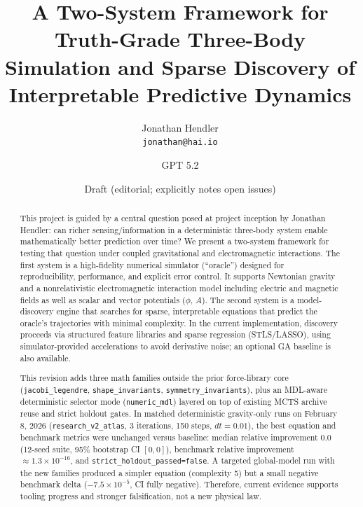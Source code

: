 \documentclass[11pt]{article}
\title{A Two-System Framework for Truth-Grade Three-Body Simulation and Sparse Discovery of Interpretable Predictive Dynamics}
\author{Jonathan Hendler\\\texttt{jonathan@hai.io} \and GPT 5.2}
\date{Draft (editorial; explicitly notes open issues)}
\begin{document}
\maketitle

\begin{abstract}
This project is guided by a central question posed at project inception by Jonathan Hendler: can richer sensing/information in a deterministic three-body system enable mathematically better prediction over time? We present a two-system framework for testing that question under coupled gravitational and electromagnetic interactions. The first system is a high-fidelity numerical simulator (``oracle'') designed for reproducibility, performance, and explicit error control. It supports Newtonian gravity and a nonrelativistic electromagnetic interaction model including electric and magnetic fields as well as scalar and vector potentials ($\phi$, $A$). The second system is a model-discovery engine that searches for sparse, interpretable equations that predict the oracle's trajectories with minimal complexity. In the current implementation, discovery proceeds via structured feature libraries and sparse regression (STLS/LASSO)\cite{Brunton2016,Tibshirani1996}, using simulator-provided accelerations to avoid derivative noise; an optional GA baseline is also available.

This revision adds three math families outside the prior force-library core (\texttt{jacobi\_legendre}, \texttt{shape\_invariants}, \texttt{symmetry\_invariants}), plus an MDL-aware deterministic selector mode (\texttt{numeric\_mdl}) layered on top of existing MCTS archive reuse and strict holdout gates. In matched deterministic gravity-only runs on February 8, 2026 (\texttt{research\_v2\_atlas}, 3 iterations, 150 steps, $dt=0.01$), the best equation and benchmark metrics were unchanged versus baseline: median relative improvement $0.0$ (12-seed suite, 95\% bootstrap CI $[0,0]$), benchmark relative improvement $\approx 1.3\times10^{-16}$, and \texttt{strict\_holdout\_passed=false}. A targeted global-model run with the new families produced a simpler equation (complexity 5) but a small negative benchmark delta ($-7.5\times10^{-5}$, CI fully negative). Therefore, current evidence supports tooling progress and stronger falsification, not a new physical law.


\end{abstract}
\end{document}
